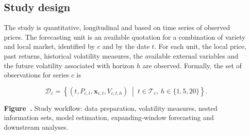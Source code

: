 \documentclass[a4paper,fleqn]{cas-sc}
\begin{document}
\subsection{Study design}
\label{subsec:study_design}

The study is quantitative, longitudinal and based on time series of observed prices. The forecasting unit is an available quotation for a combination of variety and local market, identified by \(c\) and by the date \(t\). For each unit, the local price, past returns, historical volatility measures, the available external variables and the future volatility associated with horizon \(h\) are observed. Formally, the set of observations for series \(c\) is

\begin{equation}
\mathcal{D}_{c}=\left\{\left(t,P_{c,t},\mathbf{x}_{c,t},V_{c,t,h}\right)\;\middle|\;t\in\mathcal{T}_{c},\ h\in\{1,5,20\}\right\}.
\label{eq:data_unit}
\end{equation}

\begin{center}
\begin{minipage}{\textwidth}
\centering
{}
\noindent\textbf{Figure~\thefigure.} Study workflow: data preparation, volatility measures, nested information sets, model estimation, expanding-window forecasting and downstream analyses.
\end{minipage}
\end{center}
\label{fig:study_design}
\end{document}
